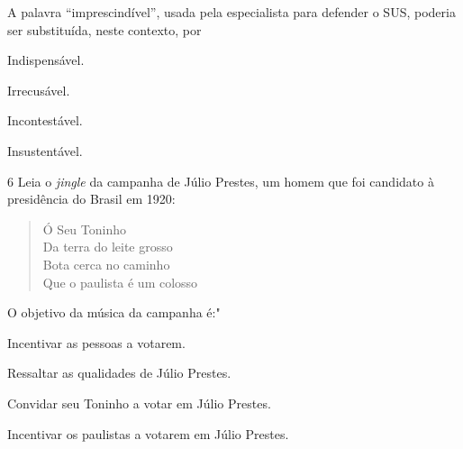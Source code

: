 \noindent A palavra ``imprescindível'', usada pela especialista para defender
o SUS, poderia ser substituída, neste contexto, por

\begin{escolha}
\item Indispensável.
\item Irrecusável.
\item Incontestável.
\item Insustentável.
\end{escolha}



\num{6} Leia o \emph{jingle} da campanha de Júlio Prestes, um homem que
foi candidato à presidência do Brasil em 1920:

\begin{verse}
Ó Seu Toninho\\
Da terra do leite grosso\\
Bota cerca no caminho\\
Que o paulista é um colosso
\end{verse}

\noindent O objetivo da música da campanha é:"

\begin{escolha}
\item Incentivar as pessoas a votarem.
\item Ressaltar as qualidades de Júlio Prestes.
\item Convidar seu Toninho a votar em Júlio Prestes.
\item Incentivar os paulistas a votarem em Júlio Prestes.
\end{escolha}

